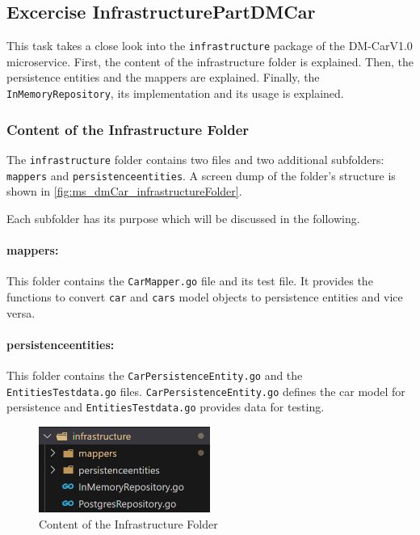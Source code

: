 \subsection{Excercise InfrastructurePartDMCar}
This task takes a close look into the \texttt{infrastructure} package of the DM-CarV1.0 microservice.
First, the content of the infrastructure folder is explained.
Then, the persistence entities and the mappers are explained.
Finally, the \texttt{InMemoryRepository}, its implementation and its usage is explained.

\subsubsection*{Content of the Infrastructure Folder}
The \texttt{infrastructure} folder contains two files and two additional subfolders: \texttt{mappers} and \texttt{persistenceentities}.
A screen dump of the folder's structure is shown in \autoref*{fig:ms_dmCar_infrastructureFolder}.

Each subfolder has its purpose which will be discussed in the following.
\paragraph*{mappers:}
This folder contains the \texttt{CarMapper.go} file and its test file.
It provides the functions to convert \texttt{car} and \texttt{cars} model objects to persistence entities and vice versa.

\paragraph*{persistenceentities:}
This folder contains the \texttt{CarPersistenceEntity.go} and the \texttt{EntitiesTestdata.go} files.
\texttt{CarPersistenceEntity.go} defines the car model for persistence and \texttt{EntitiesTestdata.go} provides data for testing.
\begin{figure}
    \centering
    \includegraphics[width=0.5\textwidth]{figures/microservices/dmCar/ms_dmCar_infrastructureFolder.png}
    \caption{Content of the Infrastructure Folder}
    \label{fig:ms_dmCar_infrastructureFolder}
\end{figure}

